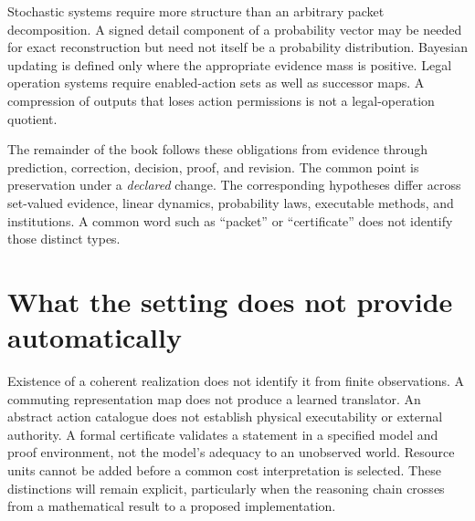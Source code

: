 Stochastic systems require more structure than an arbitrary packet decomposition. A signed detail component of a probability vector may be needed for exact reconstruction but need not itself be a probability distribution. Bayesian updating is defined only where the appropriate evidence mass is positive. Legal operation systems require enabled-action sets as well as successor maps. A compression of outputs that loses action permissions is not a legal-operation quotient.

The remainder of the book follows these obligations from evidence through prediction, correction, decision, proof, and revision. The common point is preservation under a \emph{declared} change. The corresponding hypotheses differ across set-valued evidence, linear dynamics, probability laws, executable methods, and institutions. A common word such as ``packet'' or ``certificate'' does not identify those distinct types.

\section*{What the setting does not provide automatically}
Existence of a coherent realization does not identify it from finite observations. A commuting representation map does not produce a learned translator. An abstract action catalogue does not establish physical executability or external authority. A formal certificate validates a statement in a specified model and proof environment, not the model's adequacy to an unobserved world. Resource units cannot be added before a common cost interpretation is selected. These distinctions will remain explicit, particularly when the reasoning chain crosses from a mathematical result to a proposed implementation.
